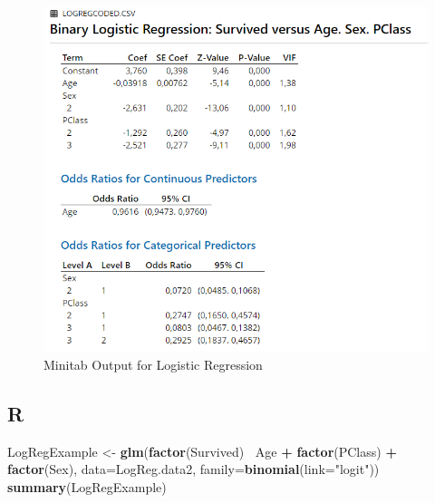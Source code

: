 \documentclass[
]{book}
\newenvironment{Shaded}{\begin{snugshade}}{\end{snugshade}}
\newcommand{\DataTypeTok}[1]{\textcolor[rgb]{0.13,0.29,0.53}{#1}}
\newcommand{\KeywordTok}[1]{\textcolor[rgb]{0.13,0.29,0.53}{\textbf{#1}}}
\newcommand{\NormalTok}[1]{#1}
\newcommand{\OperatorTok}[1]{\textcolor[rgb]{0.81,0.36,0.00}{\textbf{#1}}}
\newcommand{\StringTok}[1]{\textcolor[rgb]{0.31,0.60,0.02}{#1}}
\begin{document}
\begin{figure}[!h]
\includegraphics{Screenshots/Logistic Regression/LogRegMinitab} \caption{\label{fig:LogRegMinitab}Minitab Output for Logistic Regression}\label{fig:LogRegMinitab}
\end{figure}

\hypertarget{r-2}{%
\subsection{R}\label{r-2}}

\begin{Shaded}
\begin{Highlighting}[]
\NormalTok{LogRegExample <-}\StringTok{ }\KeywordTok{glm}\NormalTok{(}\KeywordTok{factor}\NormalTok{(Survived) }\OperatorTok{~}\NormalTok{Age }\OperatorTok{+}\StringTok{ }\KeywordTok{factor}\NormalTok{(PClass) }\OperatorTok{+}\StringTok{ }\KeywordTok{factor}\NormalTok{(Sex), }\DataTypeTok{data=}\NormalTok{LogReg.data2, }\DataTypeTok{family=}\KeywordTok{binomial}\NormalTok{(}\DataTypeTok{link=}\StringTok{"logit"}\NormalTok{))}
\KeywordTok{summary}\NormalTok{(LogRegExample)}
\end{Highlighting}
\end{Shaded}
\end{document}
